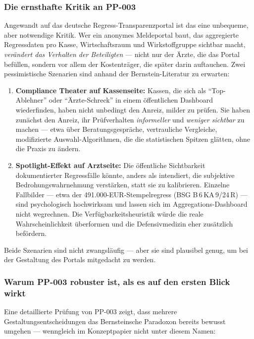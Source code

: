 \documentclass{umbruch-position}
\begin{document}
\subsubsection{Die ernsthafte Kritik an PP-003}

Angewandt auf das deutsche Regress-Transparenzportal ist das eine unbequeme, aber notwendige Kritik. Wer ein anonymes Meldeportal baut, das aggregierte Regressdaten pro Kasse, Wirtschaftsraum und Wirkstoffgruppe sichtbar macht, \textit{verändert das Verhalten der Beteiligten} --- nicht nur der Ärzte, die das Portal befüllen, sondern vor allem der Kostenträger, die später darin auftauchen. Zwei pessimistische Szenarien sind anhand der Bernstein-Literatur zu erwarten:

\begin{enumerate}
  \item \textbf{Compliance Theater auf Kassenseite:} Kassen, die sich als ``Top-Ablehner'' oder ``Ärzte-Schreck'' in einem öffentlichen Dashboard wiederfinden, haben nicht unbedingt den Anreiz, milder zu prüfen. Sie haben zunächst den Anreiz, ihr Prüfverhalten \textit{informeller} und \textit{weniger sichtbar} zu machen --- etwa über Beratungsgespräche, vertrauliche Vergleiche, modifizierte Auswahl-Algorithmen, die die statistischen Spitzen glätten, ohne die Praxis zu ändern.
  \item \textbf{Spotlight-Effekt auf Arztseite:} Die öffentliche Sichtbarkeit dokumentierter Regressfälle könnte, anders als intendiert, die subjektive Bedrohungswahrnehmung verstärken, statt sie zu kalibrieren. Einzelne Fallbilder --- etwa der 491.000-EUR-Stempelregress (BSG B\,6\,KA\,9/24\,R) --- sind psychologisch hochwirksam und lassen sich im Aggregations-Dashboard nicht wegrechnen. Die Verfügbarkeitsheuristik würde die reale Wahrscheinlichkeit überformen und die Defensivmedizin eher zusätzlich befördern.
\end{enumerate}

Beide Szenarien sind nicht zwangsläufig --- aber sie sind plausibel genug, um bei der Gestaltung des Portals mitgedacht zu werden.

\subsubsection{Warum PP-003 robuster ist, als es auf den ersten Blick wirkt}

Eine detaillierte Prüfung von PP-003 zeigt, dass mehrere Gestaltungsentscheidungen das Bernsteinsche Paradoxon bereits bewusst umgehen --- wenngleich im Konzeptpapier nicht unter diesem Namen:
\end{document}
